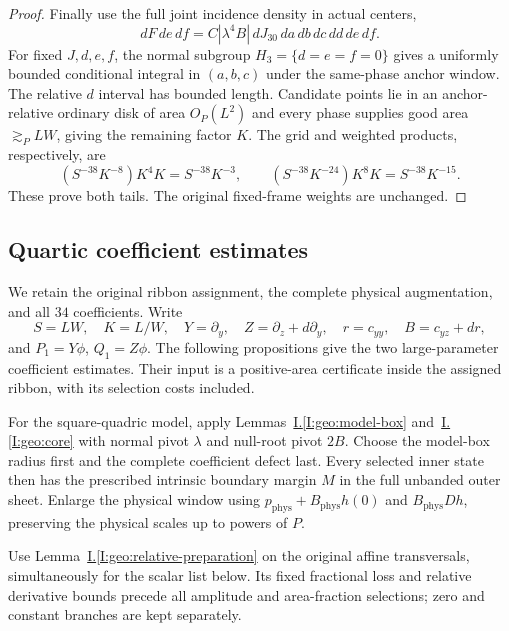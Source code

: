 \documentclass[11pt]{amsart}
\theoremstyle{definition}
\theoremstyle{remark}
\numberwithin{equation}{section}
\newcommand{\partIref}[1]{\hyperref[I:#1]{I.\ref*{I:#1}}}
\begin{document}
\begin{proof}
Finally use the full joint incidence density in actual centers,
\[
dF\,de\,df=C|\lambda^4B|\,dJ_{30}\,da\,db\,dc\,dd\,de\,df.
\]
For fixed $J,d,e,f$, the normal subgroup $H_3=\{d=e=f=0\}$ gives a uniformly bounded conditional integral in $(a,b,c)$ under the same-phase anchor window. The relative $d$ interval has bounded length. Candidate points lie in an anchor-relative ordinary disk of area $O_P(L^2)$ and every phase supplies good area $\gtrsim_PLW$, giving the remaining factor $K$. The grid and weighted products, respectively, are
\[
(S^{-38}K^{-8})K^4K=S^{-38}K^{-3},\qquad (S^{-38}K^{-24})K^8K=S^{-38}K^{-15}.
\]
These prove both tails. The original fixed-frame weights are unchanged.
\end{proof}

\subsection{Quartic coefficient estimates}\label{quartic:null-counts}\label{low:4:sf:sec:newrescaling}
We retain the original ribbon assignment, the complete physical augmentation, and all $34$ coefficients. Write
\[
S=LW,\quad K=L/W,\quad Y=\partial_y,\quad Z=\partial_z+d\partial_y,
 \quad r=c_{yy},\quad B=c_{yz}+dr,
\]
and $P_1=Y\phi$, $Q_1=Z\phi$. The following propositions give the two large-parameter coefficient estimates. Their input is a positive-area certificate inside the assigned ribbon, with its selection costs included.

For the square-quadric model, apply Lemmas~\partIref{geo:model-box} and~\partIref{geo:core} with normal pivot $\lambda$ and null-root pivot $2B$. Choose the model-box radius first and the complete coefficient defect last. Every selected inner state then has the prescribed intrinsic boundary margin $M$ in the full unbanded outer sheet. Enlarge the physical window using $p_{\mathrm{phys}}+B_{\mathrm{phys}}h(0)$ and $B_{\mathrm{phys}}Dh$, preserving the physical scales up to powers of $P$.

Use Lemma~\partIref{geo:relative-preparation} on the original affine transversals, simultaneously for the scalar list below. Its fixed fractional loss and relative derivative bounds precede all amplitude and area-fraction selections; zero and constant branches are kept separately.
\end{document}
